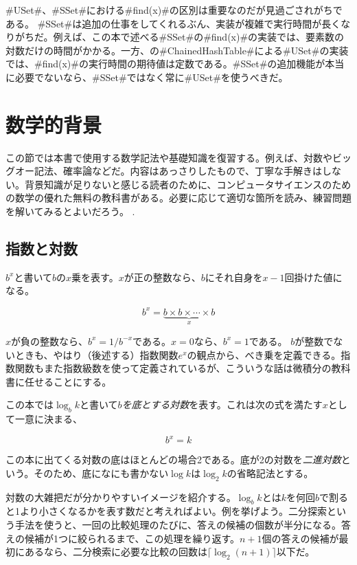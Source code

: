 #USet#、#SSet#における#find(x)#の区別は重要なのだが見過ごされがちである。 #SSet#は追加の仕事をしてくれるぶん、実装が複雑で実行時間が長くなりがちだ。例えば、この本で述べる#SSet#の#find(x)#の実装では、要素数の対数だけの時間がかかる。一方、の#ChainedHashTable#による#USet#の実装では、#find(x)#の実行時間の期待値は定数である。#SSet#の追加機能が本当に必要でないなら、#SSet#ではなく常に#USet#を使うべきだ。

\section{数学的背景}
この節では本書で使用する数学記法や基礎知識を復習する。例えば、対数やビッグオー記法、確率論などだ。内容はあっさりしたもので、丁寧な手解きはしない。背景知識が足りないと感じる読者のために、コンピュータサイエンスのための数学の優れた無料の教科書がある。必要に応じて適切な箇所を読み、練習問題を解いてみるとよいだろう。
\cite{llm11}.

\subsection{指数と対数}

$b^x$と書いて$b$の$x$乗を表す。$x$が正の整数なら、$b$にそれ自身を$x-1$回掛けた値になる。

\[
    b^x = \underbrace{b\times b\times \cdots \times b}_{x}
\]

$ x $が負の整数なら、$b^x=1/b^{-x}$である。$x=0$なら、$b^x=1$である。
$b$が整数でないときも、やはり（後述する）指数関数$e^x$の観点から、べき乗を定義できる。指数関数もまた指数級数を使って定義されているが、こういうな話は微積分の教科書に任せることにする。

この本では$\log_b k$と書いて\emph{$b$を底とする対数}を表す。これは次の式を満たす$x$として一意に決まる、

\[
    b^{x} = k
\]

この本に出てくる対数の底はほとんどの場合2である。底が2の対数を\emph{二進対数}という。そのため、底になにも書かない$\log k$は$\log_2 k$の省略記法とする。
%
%

対数の大雑把だが分かりやすいイメージを紹介する。$\log_b k$とは$k$を何回$b$で割ると1より小さくなるかを表す数だと考えればよい。例を挙げよう。二分探索という手法を使うと、一回の比較処理のたびに、答えの候補の個数が半分になる。答えの候補が1つに絞られるまで、この処理を繰り返す。$n+1$個の答えの候補が最初にあるなら、二分検索に必要な比較の回数は$\lceil \log_2(n+1) \rceil$以下だ。

